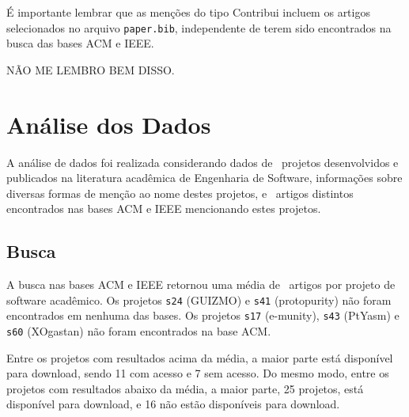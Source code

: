 

É importante lembrar que as menções do tipo Contribui incluem os artigos
selecionados no arquivo \texttt{paper.bib}, independente de terem sido
encontrados na busca das bases ACM e IEEE.

NÃO ME LEMBRO BEM DISSO.



\section{Análise dos Dados} \label{estudo2:analise} %

A análise de dados foi realizada considerando
dados de \SoftwareCount \ projetos desenvolvidos e publicados na literatura
acadêmica de Engenharia de Software, informações sobre diversas formas de
menção ao nome destes projetos, e \ScreeningUniqueCount \ artigos distintos
encontrados nas bases ACM e IEEE mencionando estes projetos.

\subsection{Busca}

A busca nas bases ACM e IEEE retornou uma média de \SearchUniqueMean \ artigos
por projeto de software acadêmico. 
Os projetos \texttt{s24} (GUIZMO) e \texttt{s41} (protopurity)
não foram encontrados em nenhuma das bases.
Os projetos \texttt{s17} (e-munity), \texttt{s43} (PtYasm) e \texttt{s60} (XOgastan)
não foram encontrados na base ACM.

Entre os projetos com resultados acima da média, 
a maior parte está disponível para download, 
sendo 11 com acesso e 7 sem acesso.  
Do mesmo modo, entre os projetos com resultados abaixo da média, 
a maior parte, 25 projetos, está disponível para download, 
e 16 não estão disponíveis para download.



